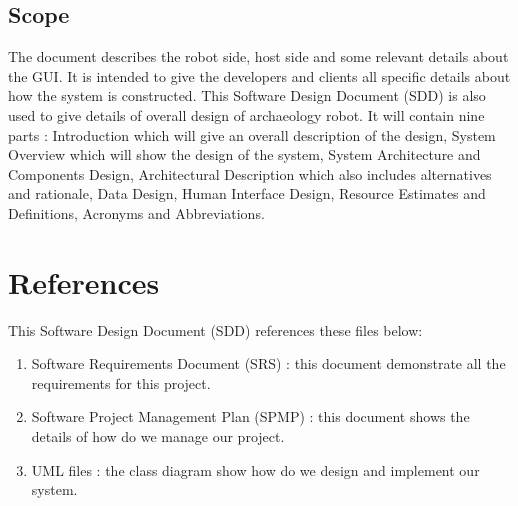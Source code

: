 \documentclass[11pt, a4paper]{report}
\begin{document}
\subsection{Scope}
The document describes the robot side, host side and some relevant details about the GUI. It is intended to give the developers and clients all specific details about how the system is constructed. This Software Design Document (SDD) is also used to give details of overall design of archaeology robot. It will contain nine parts : Introduction which will give an overall description of the design, System Overview which will show the design of the system, System Architecture and Components Design, Architectural Description which also includes alternatives and rationale, Data Design, Human Interface Design, Resource Estimates and Definitions, Acronyms and Abbreviations.


\section{References}
This Software Design Document (SDD) references these files below:
\begin{enumerate}

  \item Software Requirements Document (SRS) : this document demonstrate all the requirements for this project.

  \item Software Project Management Plan (SPMP) : this document shows the details of how do we manage our project.

  \item UML files : the class diagram show how do we design and implement our system.

\end{enumerate}

\pagebreak
\end{document}
